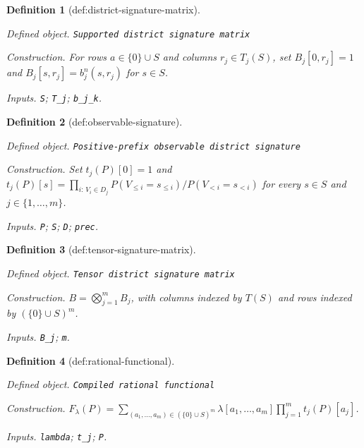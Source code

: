 \documentclass{article}
\newtheorem{definition}{Definition}
\begin{document}
\begin{definition}[def:district-signature-matrix]\label{def:district-signature-matrix}
\par\smallskip\noindent\emph{Defined object.} \texttt{Supported district signature matrix}
\par\smallskip\noindent\emph{Construction.} For rows \(a\in\{0\}\cup S\) and columns \(r_j\in T_j(S)\), set \(B_j[0,r_j]=1\) and \(B_j[s,r_j]=b_j^n(s,r_j)\) for \(s\in S\).
\par\smallskip\noindent\emph{Inputs.} \texttt{S}; \texttt{T\_\allowbreak{}j}; \texttt{b\_\allowbreak{}j\_\allowbreak{}k}.
\end{definition}

\begin{definition}[def:observable-signature]\label{def:observable-signature}
\par\smallskip\noindent\emph{Defined object.} \texttt{Positive-\allowbreak{}prefix observable district signature}
\par\smallskip\noindent\emph{Construction.} Set \(t_j(P)[0]=1\) and \(t_j(P)[s]=\prod_{i:\,V_i\in D_j}P(V_{\le i}=s_{\le i})/P(V_{<i}=s_{<i})\) for every \(s\in S\) and \(j\in\{1,\ldots,m\}\).
\par\smallskip\noindent\emph{Inputs.} \texttt{P}; \texttt{S}; \texttt{D}; \texttt{prec}.
\end{definition}

\begin{definition}[def:tensor-signature-matrix]\label{def:tensor-signature-matrix}
\par\smallskip\noindent\emph{Defined object.} \texttt{Tensor district signature matrix}
\par\smallskip\noindent\emph{Construction.} \(B=\bigotimes_{j=1}^mB_j\), with columns indexed by \(T(S)\) and rows indexed by \((\{0\}\cup S)^m\).
\par\smallskip\noindent\emph{Inputs.} \texttt{B\_\allowbreak{}j}; \texttt{m}.
\end{definition}

\begin{definition}[def:rational-functional]\label{def:rational-functional}
\par\smallskip\noindent\emph{Defined object.} \texttt{Compiled rational functional}
\par\smallskip\noindent\emph{Construction.} \(F_{\lambda}(P)=\sum_{(a_1,\ldots,a_m)\in(\{0\}\cup S)^m}\lambda[a_1,\ldots,a_m]\prod_{j=1}^m t_j(P)[a_j]\).
\par\smallskip\noindent\emph{Inputs.} \texttt{lambda}; \texttt{t\_\allowbreak{}j}; \texttt{P}.
\end{definition}
\end{document}
